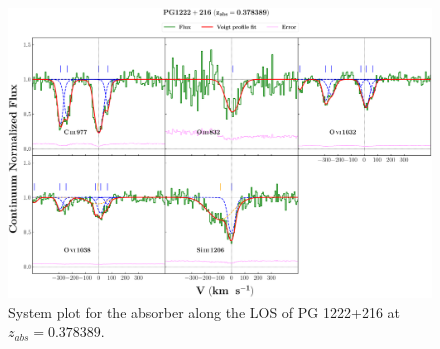   
  \newpage
  
  \begin{landscape}
  
  \begin{figure}
      \centering
      \vspace{-20mm}
      \hspace*{-35mm}
      \includegraphics[width=1.25\linewidth]{System-Plots/PG1222+216_z=0.378389_sys_plot.png}
      \caption{System plot for the absorber along the LOS of PG 1222+216 at $z_{abs} = 0.378389$. }
  \end{figure}
  
  \end{landscape}
  
